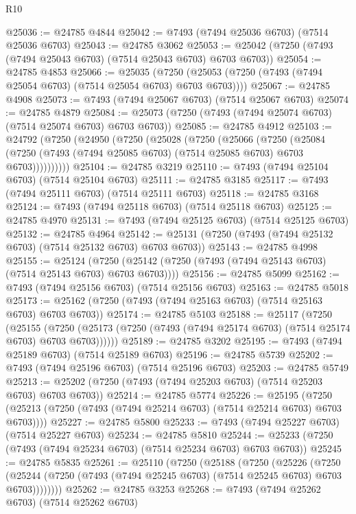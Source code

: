 \begin{lexlean}{R10}
\begin{coremodule}
@25036 := @24785 @4844
@25042 := @7493 (@7494 @25036 @6703) (@7514 @25036 @6703)
@25043 := @24785 @3062
@25053 := @25042 (@7250 (@7493 (@7494 @25043 @6703) (@7514 @25043 @6703) @6703 @6703))
@25054 := @24785 @4853
@25066 := @25035
    (@7250 (@25053 (@7250 (@7493 (@7494 @25054 @6703) (@7514 @25054 @6703) @6703 @6703))))
@25067 := @24785 @4908
@25073 := @7493 (@7494 @25067 @6703) (@7514 @25067 @6703)
@25074 := @24785 @4879
@25084 := @25073 (@7250 (@7493 (@7494 @25074 @6703) (@7514 @25074 @6703) @6703 @6703))
@25085 := @24785 @4912
@25103 := @24792
    (@7250
      (@24950
        (@7250
          (@25028
            (@7250
              (@25066
                (@7250
                  (@25084
                    (@7250 (@7493 (@7494 @25085 @6703) (@7514 @25085 @6703) @6703 @6703))))))))))
@25104 := @24785 @3219
@25110 := @7493 (@7494 @25104 @6703) (@7514 @25104 @6703)
@25111 := @24785 @3185
@25117 := @7493 (@7494 @25111 @6703) (@7514 @25111 @6703)
@25118 := @24785 @3168
@25124 := @7493 (@7494 @25118 @6703) (@7514 @25118 @6703)
@25125 := @24785 @4970
@25131 := @7493 (@7494 @25125 @6703) (@7514 @25125 @6703)
@25132 := @24785 @4964
@25142 := @25131 (@7250 (@7493 (@7494 @25132 @6703) (@7514 @25132 @6703) @6703 @6703))
@25143 := @24785 @4998
@25155 := @25124
    (@7250 (@25142 (@7250 (@7493 (@7494 @25143 @6703) (@7514 @25143 @6703) @6703 @6703))))
@25156 := @24785 @5099
@25162 := @7493 (@7494 @25156 @6703) (@7514 @25156 @6703)
@25163 := @24785 @5018
@25173 := @25162 (@7250 (@7493 (@7494 @25163 @6703) (@7514 @25163 @6703) @6703 @6703))
@25174 := @24785 @5103
@25188 := @25117
    (@7250
      (@25155
        (@7250 (@25173 (@7250 (@7493 (@7494 @25174 @6703) (@7514 @25174 @6703) @6703 @6703))))))
@25189 := @24785 @3202
@25195 := @7493 (@7494 @25189 @6703) (@7514 @25189 @6703)
@25196 := @24785 @5739
@25202 := @7493 (@7494 @25196 @6703) (@7514 @25196 @6703)
@25203 := @24785 @5749
@25213 := @25202 (@7250 (@7493 (@7494 @25203 @6703) (@7514 @25203 @6703) @6703 @6703))
@25214 := @24785 @5774
@25226 := @25195
    (@7250 (@25213 (@7250 (@7493 (@7494 @25214 @6703) (@7514 @25214 @6703) @6703 @6703))))
@25227 := @24785 @5800
@25233 := @7493 (@7494 @25227 @6703) (@7514 @25227 @6703)
@25234 := @24785 @5810
@25244 := @25233 (@7250 (@7493 (@7494 @25234 @6703) (@7514 @25234 @6703) @6703 @6703))
@25245 := @24785 @5835
@25261 := @25110
    (@7250
      (@25188
        (@7250
          (@25226
            (@7250
              (@25244 (@7250 (@7493 (@7494 @25245 @6703) (@7514 @25245 @6703) @6703 @6703))))))))
@25262 := @24785 @3253
@25268 := @7493 (@7494 @25262 @6703) (@7514 @25262 @6703)

\end{coremodule}
\end{lexlean}
